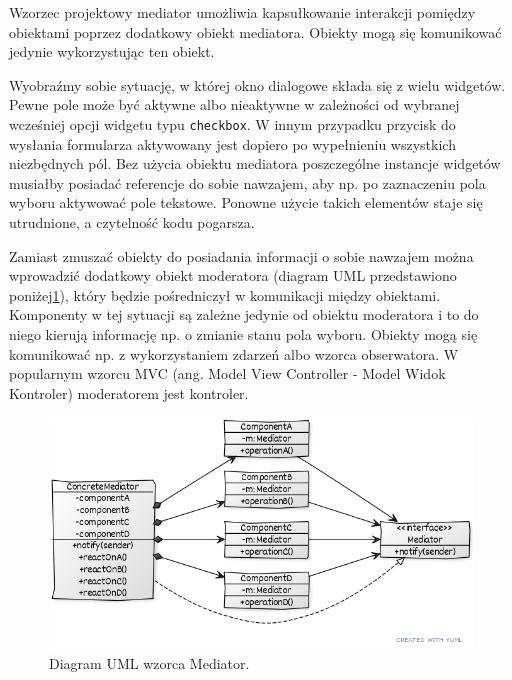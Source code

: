 Wzorzec projektowy mediator umożliwia kapsułkowanie interakcji pomiędzy obiektami poprzez dodatkowy obiekt mediatora. Obiekty mogą się komunikować jedynie wykorzystując ten obiekt.


Wyobraźmy sobie sytuację, w której okno dialogowe składa się z wielu widgetów. Pewne pole może być aktywne albo nieaktywne w zależności od wybranej wcześniej opcji widgetu typu \texttt{checkbox}. W innym przypadku przycisk do wysłania formularza aktywowany jest dopiero po wypełnieniu wszystkich niezbędnych pól. Bez użycia obiektu mediatora poszczególne instancje widgetów musiałby posiadać referencje do sobie nawzajem, aby np. po zaznaczeniu pola wyboru aktywować pole tekstowe. Ponowne użycie takich elementów staje się utrudnione, a czytelność kodu pogarsza.


Zamiast zmuszać obiekty do posiadania informacji o sobie nawzajem można wprowadzić dodatkowy obiekt moderatora (diagram UML przedstawiono poniżej\ref{lab4/fig/MediatorUml}), który będzie pośredniczył w komunikacji między obiektami. Komponenty w tej sytuacji są zależne jedynie od obiektu moderatora i to do niego kierują informację np. o zmianie stanu pola wyboru. Obiekty mogą się komunikować np. z wykorzystaniem zdarzeń albo wzorca obserwatora. W popularnym wzorcu MVC (ang. Model View Controller - Model Widok Kontroler) moderatorem jest kontroler.

\begin{figure}[hbt!]
	\centering
	\includegraphics[width=0.9\linewidth]{images/MediatorUml}
	\caption{Diagram UML wzorca Mediator.}
	\label{lab4/fig/MediatorUml}
\end{figure}
%

